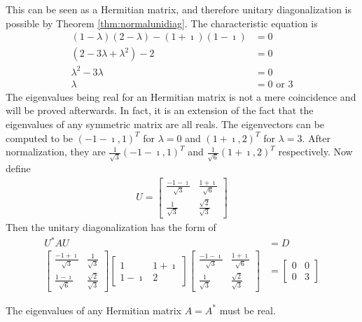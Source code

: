 \begin{solution}
This can be seen as a Hermitian matrix, and therefore unitary diagonalization is possible by Theorem \ref{thm:normalunidiag}. The characteristic equation is 
\begin{align*}
(1-\lambda)(2-\lambda) - (1+\imath)(1-\imath) &= 0 \\
(2 - 3\lambda + \lambda^2) - 2 &= 0 \\
\lambda^2 - 3\lambda &= 0 \\
\lambda &= 0 \text{ or } 3
\end{align*}
The eigenvalues being real for an Hermitian matrix is not a mere coincidence and will be proved afterwards. In fact, it is an extension of the fact that the eigenvalues of any symmetric matrix are all reals. The eigenvectors can be computed to be $(-1-\imath, 1)^T$ for $\lambda = 0$ and $(1+\imath, 2)^T$ for $\lambda = 3$. After normalization, they are $\frac{1}{\sqrt{3}}(-1-\imath, 1)^T$ and $\frac{1}{\sqrt{6}}(1+\imath, 2)^T$ respectively. Now define
\begin{align*}
U =
\begin{bmatrix}
\frac{-1-\imath}{\sqrt{3}} & \frac{1+\imath}{\sqrt{6}} \\
\frac{1}{\sqrt{3}} & \frac{\sqrt{2}}{\sqrt{3}}
\end{bmatrix}
\end{align*}
Then the unitary diagonalization has the form of
\begin{align*}
U^* AU &= D \\
\begin{bmatrix}
\frac{-1+\imath}{\sqrt{3}} & \frac{1}{\sqrt{3}} \\
\frac{1-\imath}{\sqrt{6}} & \frac{\sqrt{2}}{\sqrt{3}}
\end{bmatrix}
\begin{bmatrix}
1 & 1+\imath \\
1-\imath & 2
\end{bmatrix}
\begin{bmatrix}
\frac{-1-\imath}{\sqrt{3}} & \frac{1+\imath}{\sqrt{6}} \\
\frac{1}{\sqrt{3}} & \frac{\sqrt{2}}{\sqrt{3}}
\end{bmatrix}
&=
\begin{bmatrix}
0 & 0 \\
0 & 3
\end{bmatrix}
\end{align*}
\end{solution}
\begin{proper}
\label{proper:hermrealeig}
The eigenvalues of any Hermitian matrix $A = A^*$ must be real.
\end{proper}
